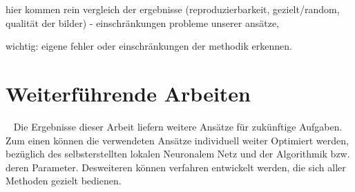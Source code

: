 hier kommen rein
vergleich der ergebnisse (reproduzierbarkeit, gezielt/random, qualität der bilder)
- einschränkungen probleme unserer ansätze, 


wichtig: eigene fehler oder einschränkungen der methodik erkennen.



\section{Weiterführende Arbeiten}~\newline 
Die Ergebnisse dieser Arbeit liefern weitere Ansätze für zukünftige Aufgaben. Zum einen können die verwendeten Ansätze individuell weiter Optimiert werden, bezüglich des selbsterstellten lokalen Neuronalem Netz und der Algorithmik bzw. deren Parameter. Desweiteren können verfahren entwickelt werden, die sich aller Methoden gezielt bedienen. 